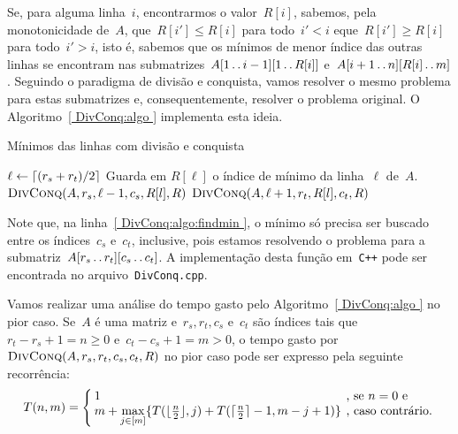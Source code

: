 Se, para alguma linha~$i$, encontrarmos o valor~$R[i]$, sabemos, pela monotonicidade de~$A$, que~${ R[i'] \leq R[i] }$ para todo~${ i' < i }$ eque~${ R[i'] \geq R[i] }$ para todo~${ i' > i }$, isto é, sabemos que os mínimos de menor índice das outras linhas se encontram nas submatrizes~${ A[1 \,.\,.\, i-1][1 \,.\,.\, R[i]] }$ e~${ A[i+1 \,.\,.\, n][R[i] \,.\,.\, m] }$. Seguindo o paradigma de divisão e conquista, vamos resolver o mesmo problema para estas submatrizes e, consequentemente, resolver o problema original. O Algoritmo~\ref{ DivConq:algo } implementa esta ideia.

\newcommand{\DivConq}{\textsc{DivConq}}
\begin{algorithm}[h]
\caption{Mínimos das linhas com divisão e conquista}
\label{ DivConq:algo }
\begin{algorithmic}[1]
\Function{\DivConq}{A, r_s, r_t, c_s, c_t, R}
        \State $\ell \leftarrow \lceil (r_s + r_t)/2 \rceil$
        \State Guarda em $R[\ell]$ o índice de mínimo da linha~$\ell$ de~$A$. \label{ DivConq:algo:findmin }
        \State $\DivConq(A,r_s,\ell-1,c_s,R[l],R)$
        \State $\DivConq(A,\ell+1,r_t,R[l],c_t,R)$
    \EndIf
\EndFunction
\end{algorithmic}
\end{algorithm}

Note que, na linha~\ref{ DivConq:algo:findmin }, o mínimo só precisa ser buscado entre os índices~$c_s$ e~$c_t$, inclusive, pois estamos resolvendo o problema para a submatriz~$A[r_s \,.\,.\, r_t][c_s \,.\,.\, c_t]$. A implementação desta função em~\texttt{C++} pode ser encontrada no arquivo~\texttt{DivConq.cpp}.

Vamos realizar uma análise do tempo gasto pelo Algoritmo~\ref{ DivConq:algo } no pior caso. Se~$A$ é uma matriz e~${ r_s,r_t,c_s }$ e~$c_t$ são índices tais que~${ r_t - r_s + 1 = n \geq 0 }$ e~${ c_t - c_s + 1 = m > 0 }$, o tempo gasto por~$\DivConq(A,r_s,r_t,c_s,c_t,R)$ no pior caso pode ser expresso pela seguinte recorrência:
\begin{equation*}
\arraycolsep=2pt
T(n,m) = \left\{
\begin{array}{ll}
    1 &  \text{, se } n = 0 \text{ e } \\
    m + \max\limits_{j \in [m]}\{ T(\floor{ \frac{n}{2} },j) + T(\ceil{ \frac{n}{2} } - 1, m - j + 1) \} & \text{, caso contrário.} \\
\end{array}
\right.
\end{equation*}

